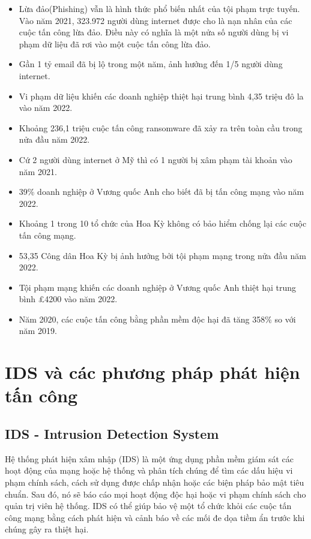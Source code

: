 \begin{itemize}
    \item Lừa đảo(Phishing) vẫn là hình thức phổ biến nhất của tội phạm trực tuyến. Vào năm 2021, 323.972 người dùng internet được cho là nạn nhân của các cuộc tấn công lừa đảo. Điều này có nghĩa là một nửa số người dùng bị vi phạm dữ liệu đã rơi vào một cuộc tấn công lừa đảo.
    \item Gần 1 tỷ email đã bị lộ trong một năm, ảnh hưởng đến 1/5 người dùng internet.
    \item Vi phạm dữ liệu khiến các doanh nghiệp thiệt hại trung bình 4,35 triệu đô la vào năm 2022.
    \item Khoảng 236,1 triệu cuộc tấn công ransomware đã xảy ra trên toàn cầu trong nửa đầu năm 2022.
    \item Cứ 2 người dùng internet ở Mỹ thì có 1 người bị xâm phạm tài khoản vào năm 2021.
    \item 39\% doanh nghiệp ở Vương quốc Anh cho biết đã bị tấn công mạng vào năm 2022.
    \item Khoảng 1 trong 10 tổ chức của Hoa Kỳ không có bảo hiểm chống lại các cuộc tấn công mạng.
    \item 53,35 Công dân Hoa Kỳ bị ảnh hưởng bởi tội phạm mạng trong nửa đầu năm 2022.
    \item Tội phạm mạng khiến các doanh nghiệp ở Vương quốc Anh thiệt hại trung bình £4200 vào năm 2022.
    \item Năm 2020, các cuộc tấn công bằng phần mềm độc hại đã tăng 358\% so với năm 2019.
\end{itemize}

\section{IDS và các phương pháp phát hiện tấn công}
\subsection{IDS - Intrusion Detection System}

Hệ thống phát hiện xâm nhập (IDS) là một ứng dụng phần mềm giám sát
các hoạt động của mạng hoặc hệ thống và phân tích chúng để tìm các
dấu hiệu vi phạm chính sách, cách sử dụng được chấp nhận hoặc các biện
pháp bảo mật tiêu chuẩn. Sau đó, nó sẽ báo cáo mọi hoạt động độc hại
hoặc vi phạm chính sách cho quản trị viên hệ thống. IDS có thể giúp
bảo vệ một tổ chức khỏi các cuộc tấn công mạng bằng cách phát hiện và
cảnh báo về các mối đe dọa tiềm ẩn trước khi chúng gây ra thiệt hại.

